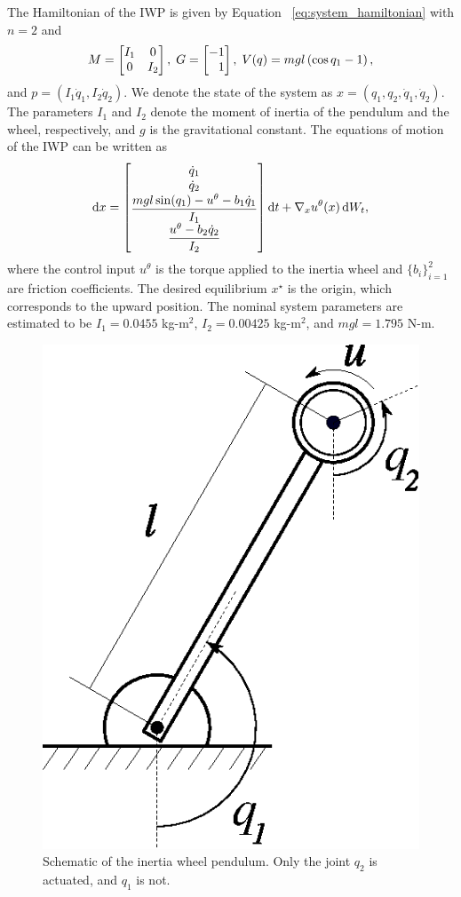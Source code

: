 The Hamiltonian of the IWP is given by Equation ~\eqref{eq:system_hamiltonian}
with $n=2$ and
%
\begin{equation*}
    M = \begin{bmatrix}I_1 & 0 \\ 0 & I_2\end{bmatrix},
    \;
    G = \begin{bmatrix}-1 \\ \phantom{-}1\end{bmatrix},
    \;
    V(q) = mgl \left( \cos q_1 - 1 \right),
\end{equation*}
%
and $p = \left(I_1 \dot{q}_1,I_2 \dot{q}_2\right)$. 
%
We denote the state of the system as $x = (q_1, q_2, \dot{q}_1, \dot{q}_2)$.
%
The parameters \(I_1\) and \(I_2\) denote the moment of inertia of the pendulum
and the wheel, respectively, and \(g\) is the gravitational constant.
%
The equations of motion of the IWP can be written as 
%
\begin{equation}
    \operatorname{d}\! x = \begin{bmatrix}\dot{q}_1 \\ \dot{q}_2 \\ \dfrac{mgl \sin(q_1) - u^\theta - b_1\dot{q}_1}{I_1} \\ \dfrac{u^\theta - b_2 \dot{q}_2}{I_2}\end{bmatrix} \operatorname{d}\! t + \nabla_x u^\theta(x) \operatorname{d}\! W_t, 
    \label{eq:iwp_dynamics}
\end{equation}
%
where the control input \(u^\theta\) is the torque applied to the inertia wheel
and $\{b_i\}_{i=1}^2$ are friction coefficients.
%
The desired equilibrium $x^\star$ is the origin, which corresponds to the upward
position.
%
The nominal system parameters are estimated to be $I_1 = 0.0455$ kg-m$^2$, $I_2
= 0.00425$ kg-m$^2$, and $mgl = 1.795$ N-m. 
%
%

\begin{figure}[t]
    \centering
    \includegraphics[width=0.25\linewidth]{figures/iwp.eps}
    \caption{Schematic of the inertia wheel pendulum. Only the joint $q_2$ is actuated, and $q_1$ is not.}
    \label{fig:iwp}
\end{figure}

